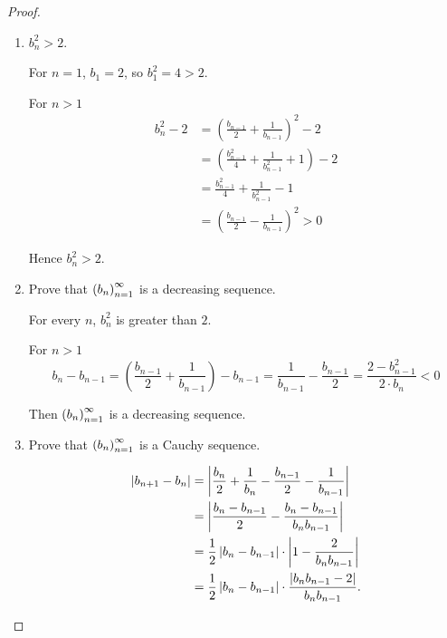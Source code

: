 \begin{proof}
    \begin{enumerate}[label={\textbf{Step \arabic*.}},itemindent=1cm]
        \item ${b^{2}_{n}} > 2$.

              For $n = 1$, $b_{1} = 2$, so $b^{2}_{1} = 4 > 2$.

              For $n > 1$
              \begin{align*}
                  {b^{2}_{n}} - 2 & = {\left(\frac{b_{n-1}}{2} + \frac{1}{b_{n-1}}\right)}^{2} - 2         \\
                                  & = {\left(\frac{b^{2}_{n-1}}{4} + \frac{1}{b^{2}_{n-1}} + 1\right)} - 2 \\
                                  & = \frac{b^{2}_{n-1}}{4} + \frac{1}{b^{2}_{n-1}} - 1                    \\
                                  & = {\left(\frac{b_{n-1}}{2} - \frac{1}{b_{n-1}}\right)}^{2} > 0
              \end{align*}

              Hence $b^{2}_{n} > 2$.
        \item Prove that ${\left({b_{n}}\right)}^{\infty}_{n=1}$ is a decreasing sequence.

              For every $n$, ${b^{2}_{n}}$ is greater than $2$.

              For $n > 1$
              \[
                  b_{n} - b_{n-1} = \left(\frac{b_{n-1}}{2} + \frac{1}{b_{n-1}}\right) - b_{n-1} = \frac{1}{b_{n-1}} - \frac{b_{n-1}}{2} = \frac{2 - {b}^{2}_{n-1}}{2\cdot b_{n}} < 0
              \]

              Then ${\left({b_{n}}\right)}^{\infty}_{n=1}$ is a decreasing sequence.
        \item Prove that ${\left({b_{n}}\right)}^{\infty}_{n=1}$ is a Cauchy sequence.

              \begin{align*}
                  \left\vert{b_{n+1} - b_{n}}\right\vert & = \left\vert{\frac{b_{n}}{2} + \frac{1}{b_{n}} - \frac{b_{n-1}}{2} - \frac{1}{b_{n-1}}}\right\vert   \\
                                        & = \left\vert{\frac{b_{n} - b_{n-1}}{2} - \frac{b_{n} - b_{n-1}}{b_{n}b_{n-1}}}\right\vert            \\
                                        & = \frac{1}{2}\left\vert{b_{n} - b_{n-1}}\right\vert\cdot\left\vert{1 - \frac{2}{b_{n}b_{n-1}}}\right\vert             \\
                                        & = \frac{1}{2}\left\vert{b_{n} - b_{n-1}}\right\vert\cdot\frac{\left\vert{b_{n}b_{n-1} - 2}\right\vert}{b_{n}b_{n-1}}.
              \end{align*}


\end{enumerate}
\end{proof}
